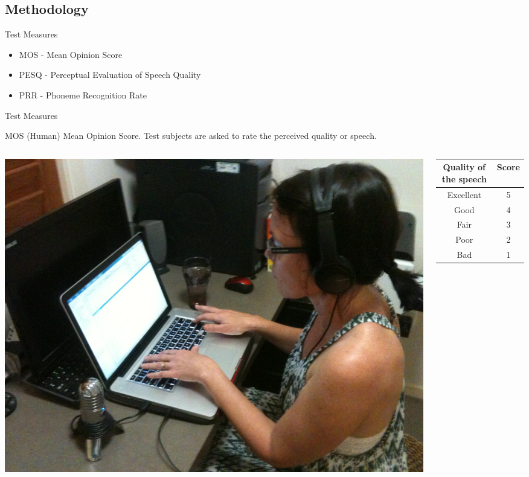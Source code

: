 \subsection{Methodology}
\begin{frame}{Test Measures}
	\begin{itemize}
		\item MOS - Mean Opinion Score
		\item PESQ - Perceptual Evaluation of Speech Quality
		\item PRR - Phoneme Recognition Rate
	\end{itemize}
\end{frame}
{\nologo
\begin{frame}{Test Measures}
	\begin{block}{MOS (Human)}
		Mean Opinion Score. Test subjects are asked to rate the perceived quality or speech.

		\begin{columns}[c]
		\begin{column}{0.4\textwidth}
			\includegraphics[width=\textwidth,height=0.8\textheight,keepaspectratio]{fig/mos.jpg}
		\end{column}
		\begin{column}{0.5\textwidth}
			\begin{tabular}{|c|c|}
			\hline 
			Quality of the speech & Score\tabularnewline
			\hline 
			\hline 
			Excellent & 5\tabularnewline
			\hline 
			Good & 4\tabularnewline
			\hline 
			Fair & 3\tabularnewline
			\hline 
			Poor & 2\tabularnewline
			\hline 
			Bad & 1\tabularnewline
			\hline 
			\end{tabular}
		\end{column}
		\end{columns}
	\end{block}
\end{frame}
}
